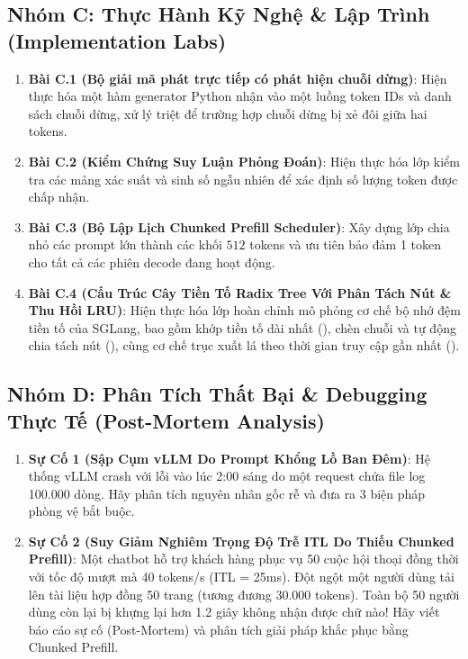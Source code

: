 \subsection{Nhóm C: Thực Hành Kỹ Nghệ \& Lập Trình (Implementation Labs)}
\begin{enumerate}
  \item \textbf{Bài C.1 (Bộ giải mã phát trực tiếp có phát hiện chuỗi dừng)}:
  Hiện thực hóa một hàm generator Python  nhận vào một luồng token IDs và danh sách chuỗi dừng, xử lý triệt để trường hợp chuỗi dừng bị xẻ đôi giữa hai tokens.

  \item \textbf{Bài C.2 (Kiểm Chứng Suy Luận Phỏng Đoán)}:
  Hiện thực hóa lớp  kiểm tra các mảng xác suất và sinh số ngẫu nhiên để xác định số lượng token được chấp nhận.

  \item \textbf{Bài C.3 (Bộ Lập Lịch Chunked Prefill Scheduler)}:
  Xây dựng lớp  chia nhỏ các prompt lớn thành các khối $512$ tokens và ưu tiên bảo đảm 1 token cho tất cả các phiên decode đang hoạt động.

  \item \textbf{Bài C.4 (Cấu Trúc Cây Tiền Tố Radix Tree Với Phân Tách Nút \& Thu Hồi LRU)}:
  Hiện thực hóa lớp  hoàn chỉnh mô phỏng cơ chế bộ nhớ đệm tiền tố của SGLang, bao gồm khớp tiền tố dài nhất (), chèn chuỗi và tự động chia tách nút (), cùng cơ chế trục xuất lá theo thời gian truy cập gần nhất ().
\end{enumerate}

\subsection{Nhóm D: Phân Tích Thất Bại \& Debugging Thực Tế (Post-Mortem Analysis)}
\begin{enumerate}
  \item \textbf{Sự Cố 1 (Sập Cụm vLLM Do Prompt Khổng Lồ Ban Đêm)}:
  Hệ thống vLLM crash với lỗi  vào lúc 2:00 sáng do một request chứa file log 100.000 dòng. Hãy phân tích nguyên nhân gốc rễ và đưa ra 3 biện pháp phòng vệ bắt buộc.

  \item \textbf{Sự Cố 2 (Suy Giảm Nghiêm Trọng Độ Trễ ITL Do Thiếu Chunked Prefill)}:
  Một chatbot hỗ trợ khách hàng phục vụ 50 cuộc hội thoại đồng thời với tốc độ mượt mà 40 tokens/s (ITL = 25ms). Đột ngột một người dùng tải lên tài liệu hợp đồng 50 trang (tương đương 30.000 tokens). Toàn bộ 50 người dùng còn lại bị khựng lại hơn 1.2 giây không nhận được chữ nào! Hãy viết báo cáo sự cố (Post-Mortem) và phân tích giải pháp khắc phục bằng Chunked Prefill.
\end{enumerate}

